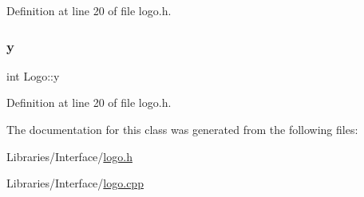 Definition at line 20 of file logo.\+h.

\mbox{\label{class_logo_a33846b1b3ac0da8180c888fb9a1680f6}} 
\subsubsection{\texorpdfstring{y}{y}}
{\footnotesize\ttfamily int Logo\+::y\hspace{0.3cm}{\ttfamily [private]}}



Definition at line 20 of file logo.\+h.



The documentation for this class was generated from the following files\+:\begin{DoxyCompactItemize}
\item 
Libraries/\+Interface/\mbox{\hyperlink{logo_8h}{logo.\+h}}\item 
Libraries/\+Interface/\mbox{\hyperlink{logo_8cpp}{logo.\+cpp}}\end{DoxyCompactItemize}
